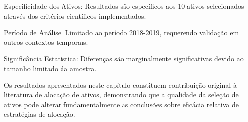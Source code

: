 Especificidade dos Ativos: Resultados são específicos aos 10 ativos selecionados através dos critérios científicos implementados.

Período de Análise: Limitado ao período 2018-2019, requerendo validação em outros contextos temporais.

Significância Estatística: Diferenças são marginalmente significativas devido ao tamanho limitado da amostra.

Os resultados apresentados neste capítulo constituem contribuição original à literatura de alocação de ativos, demonstrando que a qualidade da seleção de ativos pode alterar fundamentalmente as conclusões sobre eficácia relativa de estratégias de alocação.